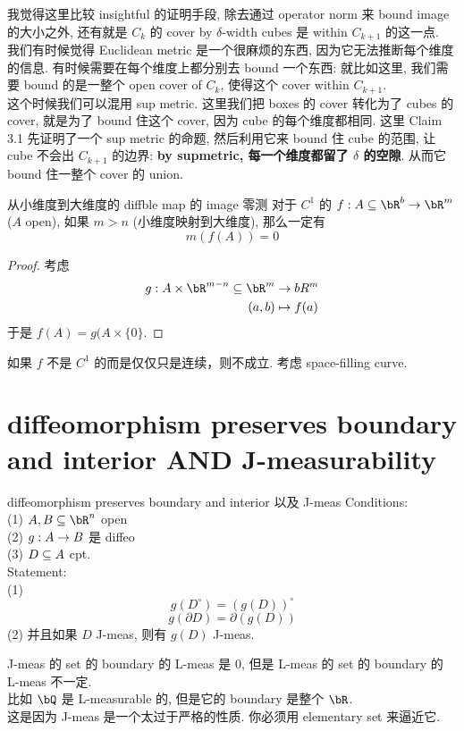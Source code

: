 \begin{remark}
我觉得这里比较 insightful 的证明手段, 除去通过 operator norm 来 bound image 的大小之外, 还有就是 $C_k$ 的 cover by $\delta$-width cubes 是 within $C_{k+1}$ 的这一点. \\
我们有时候觉得 Euclidean metric 是一个很麻烦的东西, 因为它无法推断每个维度的信息. 有时候需要在每个维度上都分别去 bound 一个东西: 就比如这里, 我们需要 bound 的是一整个 open cover of $C_k$, 使得这个 cover within $C_{k+1}$.\\
这个时候我们可以混用 sup metric. 这里我们把 boxes 的 cover 转化为了 cubes 的 cover, 就是为了 bound 住这个 cover, 因为 cube 的每个维度都相同. 这里 Claim 3.1 先证明了一个 sup metric 的命题, 然后利用它来 bound 住 cube 的范围, 让 cube 不会出 $C_{k+1}$ 的边界: \textbf{by supmetric, 每一个维度都留了 $\delta$ 的空隙}. 从而它 bound 住一整个 cover 的 union. 
\end{remark}





\begin{corollary}{从小维度到大维度的 diffble map 的 image 零测}
    对于 $C^1$ 的 $f: A \sub \bR^b \rar \bR^m $($A$ open), 如果 $m > n$ (小维度映射到大维度), 那么一定有 
    $$
    m(f(A)) = 0
    $$
\end{corollary}
\begin{proof}
    考虑
    \begin{align}
        g: A \times \bR^{m-n} \sub \bR^m &\rar bR^m\\
        (a,b) & \mapsto f(a)
    \end{align}
    于是 $f(A) = g(A \times \{0\}$.
\end{proof}
\begin{remark}
    如果 $f$ 不是 $C^1$ 的而是仅仅只是连续，则不成立. 考虑 space-filling curve.\\
\end{remark}


\section{diffeomorphism preserves boundary and interior AND J-measurability}
\begin{theorem}{diffeomorphism preserves boundary and interior 以及 J-meas}
Conditions:\\
(1) $A,B \sub \bR^n$ open\\
(2) $g: A \rightarrow B$ 是 diffeo\\
(3) $D \subseteq A$ cpt.\\
Statement:\\
(1) 
$$
g(D^{\circ}) = (g(D))^{\circ}
$$
$$
g(\partial D) = \partial(g(D))
$$
(2) 并且如果 $D$ J-meas, 则有 $g(D)$ J-meas.
\end{theorem}
\begin{remark}
    J-meas 的 set 的 boundary 的 L-meas 是 0, 但是 L-meas 的 set 的 boundary 的 L-meas 不一定.\\
    比如 $\bQ$ 是 L-measurable 的, 但是它的 boundary 是整个 $\bR$.\\
    这是因为 J-meas 是一个太过于严格的性质. 你必须用 elementary set 来逼近它. 
\end{remark}



